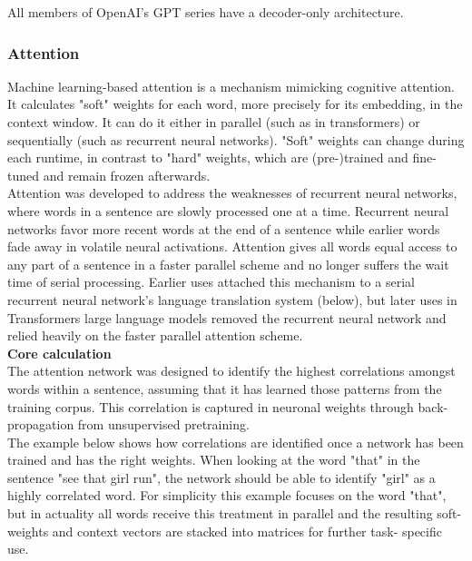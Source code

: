 All members of OpenAI's GPT series have a decoder-only architecture.
\\

\subsubsection{\textbf{Attention}}
\cite{Attention}
Machine learning-based attention is a mechanism mimicking cognitive attention. It calculates "soft" weights for each word, more precisely for its embedding, in the context window. It can do it either in parallel (such as in transformers) or sequentially (such as recurrent neural networks). "Soft" weights can change during each runtime, in contrast to "hard" weights, which are (pre-)trained and fine-tuned and remain frozen afterwards.
\\

Attention was developed to address the weaknesses of recurrent neural networks, where words in a sentence are slowly processed one at a time. Recurrent neural networks favor more recent words at the end of a sentence while earlier words fade away in volatile neural activations. Attention gives all words equal access to any part of a sentence in a faster parallel scheme and no longer suffers the wait time of serial processing. Earlier uses attached this mechanism to a serial recurrent neural network's language translation system (below), but later uses in Transformers large language models removed the recurrent neural network and relied heavily on the faster parallel attention scheme.
\\

\textbf{Core calculation}\\
The attention network was designed to identify the highest correlations amongst words within a sentence, assuming that it has learned those patterns from the training corpus.  This correlation is captured in neuronal weights through back-propagation from unsupervised pretraining.
\\

The example below shows how correlations are identified once a network has been trained and has the right weights.  When looking at the word "that" in the sentence "see that girl run", the network should be able to identify "girl" as a highly correlated word.  For simplicity this example focuses on the word "that", but in actuality all words receive this treatment in parallel and the resulting soft-weights and context vectors are stacked into matrices for further task- specific use.
\\

